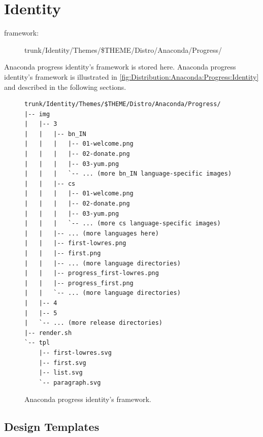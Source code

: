     \section{Identity}
\hypertarget{sec:Distribution:Anaconda:Progress:Identity}{}
      \label{sec:Distribution:Anaconda:Progress:Identity}

\begin{description}
\item[framework:] trunk/Identity/Themes/\$THEME/Distro/Anaconda/Progress/
\end{description}

\noindent Anaconda progress identity's framework is stored here.
Anaconda progress identity's framework is illustrated in
\autoref{fig:Distribution:Anaconda:Progress:Identity} and described in
the following sections.

\begin{figure}
\hrulefill
\begin{verbatim}
trunk/Identity/Themes/$THEME/Distro/Anaconda/Progress/
|-- img
|   |-- 3
|   |   |-- bn_IN
|   |   |   |-- 01-welcome.png
|   |   |   |-- 02-donate.png
|   |   |   |-- 03-yum.png
|   |   |   `-- ... (more bn_IN language-specific images)
|   |   |-- cs
|   |   |   |-- 01-welcome.png
|   |   |   |-- 02-donate.png
|   |   |   |-- 03-yum.png
|   |   |   `-- ... (more cs language-specific images)
|   |   |-- ... (more languages here)
|   |   |-- first-lowres.png
|   |   |-- first.png
|   |   |-- ... (more language directories)
|   |   |-- progress_first-lowres.png
|   |   |-- progress_first.png
|   |   `-- ... (more language directories)
|   |-- 4
|   |-- 5
|   `-- ... (more release directories)
|-- render.sh
`-- tpl
    |-- first-lowres.svg
    |-- first.svg
    |-- list.svg
    `-- paragraph.svg
\end{verbatim}
\hrulefill
\caption{Anaconda progress identity's framework.%
   \label{fig:Distribution:Anaconda:Progress:Identity}}
\end{figure}

 \subsection{Design Templates}
\hypertarget{sec:Distribution:Anaconda:Progress:Identity:Templates}{}
      \label{sec:Distribution:Anaconda:Progress:Identity:Templates}

